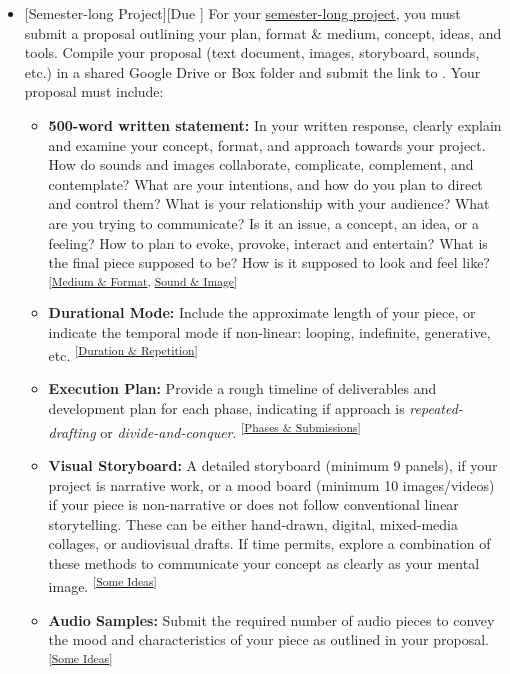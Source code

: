 \begin{itemize}[noitemsep,topsep=0pt,leftmargin=*]
	\item {}[Semester-long Project][Due \dWed] \newline
	      For your \hyperlink{longproject}{semester-long project}, you must submit a proposal outlining your plan, format \& medium, concept, ideas, and tools. Compile your proposal (text document, images, storyboard, sounds, etc.) in a shared Google Drive or Box folder and submit the link to . Your proposal must include:
	      \begin{itemize}
		      \item \textbf{500-word written statement:} In your written response, clearly explain and examine your concept, format, and approach towards your project. How do sounds and images collaborate, complicate, complement, and contemplate? What are your intentions, and how do you plan to direct and control them? What is your relationship with your audience? What are you trying to communicate? Is it an issue, a concept, an idea, or a feeling? How to plan to evoke, provoke, interact and entertain? What is the final piece supposed to be? How is it supposed to look and feel like? \textsuperscript{[\hyperlink{projformat}{Medium \& Format}, \hyperlink{projstyle}{Sound \& Image}]}
		      \item \textbf{Durational Mode:} Include the approximate length of your piece, or indicate the temporal mode if non-linear: looping, indefinite, generative, etc. \textsuperscript{[\hyperlink{projduration}{Duration \& Repetition}]}
		      \item \textbf{Execution Plan:} Provide a rough timeline of deliverables and development plan for each phase, indicating if approach is \emph{repeated-drafting} or \emph{divide-and-conquer}. \textsuperscript{[\hyperlink{projphase}{Phases \& Submissions}]}
		      \item \textbf{Visual Storyboard:} A detailed storyboard (minimum 9 panels), if your project is narrative work, or a mood board (minimum 10 images/videos) if your piece is non-narrative or does not follow conventional linear storytelling. These can be either hand-drawn, digital, mixed-media collages, or audiovisual drafts. If time permits, explore a combination of these methods to communicate your concept as clearly as your mental image. \textsuperscript{[\hyperlink{projideas}{Some Ideas}]}
		      \item \textbf{Audio Samples:} Submit the required number of audio pieces to convey the mood and characteristics of your piece as outlined in your proposal. \textsuperscript{[\hyperlink{projideas}{Some Ideas}]}

\end{itemize}
\end{itemize}
